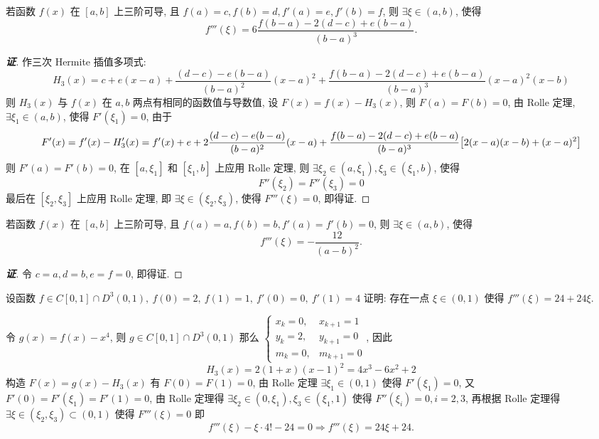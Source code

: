 \begin{theorem}
    若函数 $f(x)\text{ 在 }[a,b]$ 上三阶可导, 且 $f(a)=c,f(b)=d,f'(a)=e,f'(b)=f$, 则 $\exists\xi\in(a,b)$, 使得 $$f'''(\xi)=6\dfrac{f(b-a)-2(d-c)+e(b-a)}{(b-a)^3}.$$
\end{theorem}
\begin{proof}[{\songti \textbf{证}}]
    作三次 Hermite 插值多项式: $$H_3(x)=c+e(x-a)+\dfrac{(d-c)-e(b-a)}{(b-a)^2}(x-a)^2+\dfrac{f(b-a)-2(d-c)+e(b-a)}{(b-a)^3}(x-a)^2(x-b)$$
    则 $H_3(x)$ 与 $f(x)$ 在 $a,b$ 两点有相同的函数值与导数值, 设 $F(x)=f(x)-H_3(x)$, 则 $F(a)=F(b)=0$, 由 Rolle 定理, $\exists\xi_1\in(a,b)$, 使得 $F'(\xi_1)=0$, 
    由于 $$F'(x)=f'(x)-H_3'(x)=f'(x)+e+2\dfrac{(d-c)-e(b-a)}{(b-a)^2}(x-a)+\dfrac{f(b-a)-2(d-c)+e(b-a)}{(b-a)^3}\qty[2(x-a)(x-b)+(x-a)^2]$$
    则 $F'(a)=F'(b)=0$, 在 $[a,\xi_1]$ 和 $[\xi_1,b]$ 上应用 Rolle 定理, 则 $\exists\xi_2\in(a,\xi_1),\xi_3\in(\xi_1,b)$, 使得 $$F''(\xi_2)=F''(\xi_3)=0$$
    最后在 $[\xi_2,\xi_3]$ 上应用 Rolle 定理, 即 $\exists\xi\in(\xi_2,\xi_3)$, 使得 $F'''(\xi)=0$, 即得证.
\end{proof}
\begin{inference}
    若函数 $f(x)\text{ 在 }[a,b]$ 上三阶可导, 且 $f(a)=a,f(b)=b,f'(a)=f'(b)=0$, 则 $\exists\xi\in(a,b)$, 使得 $$f'''(\xi)=-\dfrac{12}{(a-b)^2}.$$
\end{inference}
\begin{proof}[{\songti \textbf{证}}]
    令 $c=a,d=b,e=f=0$, 即得证. 
\end{proof}

\begin{example}
    设函数 $f\in C[0,1]\cap D^3(0,1),~f(0)=2,~f(1)=1,~f'(0)=0,~f'(1)=4$ 证明: 存在一点 $\xi\in(0,1)$ 使得 $f'''(\xi)=24+24\xi.$
\end{example}
\begin{solution}
    令 $g(x)=f(x)-x^4$, 则 $g\in C[0,1]\cap D^3(0,1)$ 那么 $\begin{cases}
            x_k=0  , & x_{k+1}=1 \\
            y_k=2  , & y_{k+1}=0 \\
            m_k=0  , & m_{k+1}=0
        \end{cases}$, 因此
        $$H_3(x)=2(1+x)(x-1)^2=4x^3-6x^2+2$$
        构造 $F(x)=g(x)-H_3(x)$ 有 $F(0)=F(1)=0$, 由 Rolle 定理 $\exists\xi_1\in(0,1)$ 使得 $F'(\xi_1)=0$, 
        又 $F'(0)=F'(\xi_1)=F'(1)=0$, 由 Rolle 定理得 $\exists \xi_2\in(0,\xi_1),\xi_3\in(\xi_1,1)$ 使得 $F''(\xi_i)=0,i=2,3$, 
        再根据 Rolle 定理得 $\exists\xi\in(\xi_2,\xi_3)\subset(0,1)$ 使得 $F'''(\xi)=0$ 即
        $$f'''(\xi)-\xi\cdot4!-24=0\Rightarrow f'''(\xi)=24\xi+24.$$
\end{solution}